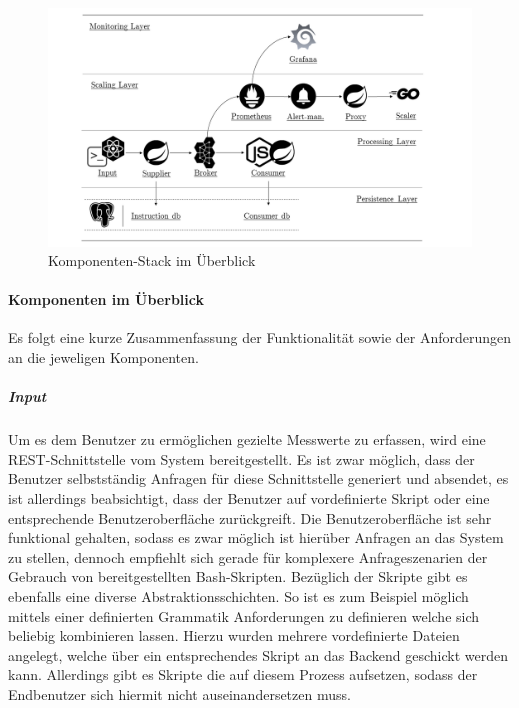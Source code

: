 \begin{figure}[ht!]
	\centering
	\includegraphics[width=\linewidth]{kapitel/problemloesung/implementierung/_img/overview-bw}
	\caption[Komponenten-Stack im Überblick]{Komponenten-Stack im Überblick}
	\label{fig:stackOverview}
\end{figure}



\paragraph{Komponenten im Überblick}
Es folgt eine kurze Zusammenfassung der Funktionalität sowie der Anforderungen an die jeweligen Komponenten.

\subparagraph{Input}
Um es dem Benutzer zu ermöglichen gezielte Messwerte zu erfassen, wird eine REST-Schnittstelle vom System bereitgestellt. Es ist zwar möglich, dass der Benutzer selbstständig Anfragen für diese Schnittstelle generiert und absendet, es ist allerdings beabsichtigt, dass der Benutzer auf vordefinierte Skript oder eine entsprechende Benutzeroberfläche zurückgreift. Die Benutzeroberfläche ist sehr funktional gehalten, sodass es zwar möglich ist hierüber Anfragen an das System zu stellen, dennoch empfiehlt sich gerade für komplexere Anfrageszenarien der Gebrauch von bereitgestellten Bash-Skripten. Bezüglich der Skripte gibt es ebenfalls eine diverse Abstraktionsschichten. So ist es zum Beispiel möglich mittels einer definierten Grammatik Anforderungen zu definieren welche sich beliebig kombinieren lassen. Hierzu wurden mehrere vordefinierte Dateien angelegt, welche über ein entsprechendes Skript an das Backend geschickt werden kann. Allerdings gibt es Skripte die auf diesem Prozess aufsetzen, sodass der Endbenutzer sich hiermit nicht auseinandersetzen muss. 


